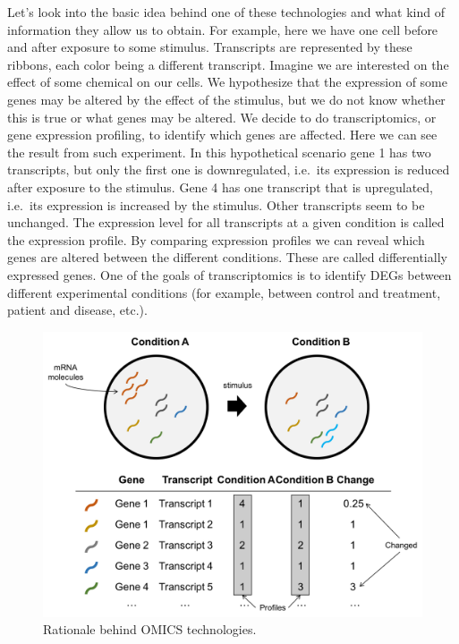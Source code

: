 \documentclass[]{book}
\theoremstyle{definition}
\theoremstyle{definition}
\theoremstyle{definition}
\theoremstyle{remark}
\begin{document}
Let's look into the basic idea behind one of these technologies and what
kind of information they allow us to obtain. For example, here we have
one cell before and after exposure to some stimulus. Transcripts are
represented by these ribbons, each color being a different transcript.
Imagine we are interested on the effect of some chemical on our cells.
We hypothesize that the expression of some genes may be altered by the
effect of the stimulus, but we do not know whether this is true or what
genes may be altered. We decide to do transcriptomics, or gene
expression profiling, to identify which genes are affected. Here we can
see the result from such experiment. In this hypothetical scenario gene
1 has two transcripts, but only the first one is downregulated, i.e.~its
expression is reduced after exposure to the stimulus. Gene 4 has one
transcript that is upregulated, i.e.~its expression is increased by the
stimulus. Other transcripts seem to be unchanged. The expression level
for all transcripts at a given condition is called the expression
profile. By comparing expression profiles we can reveal which genes are
altered between the different conditions. These are called
differentially expressed genes. One of the goals of transcriptomics is
to identify DEGs between different experimental conditions (for example,
between control and treatment, patient and disease, etc.).

\begin{figure}
\includegraphics[width=19.24in]{pic/omics_2} \caption{Rationale behind OMICS technologies.}\label{fig:omics-2}
\end{figure}
\end{document}
